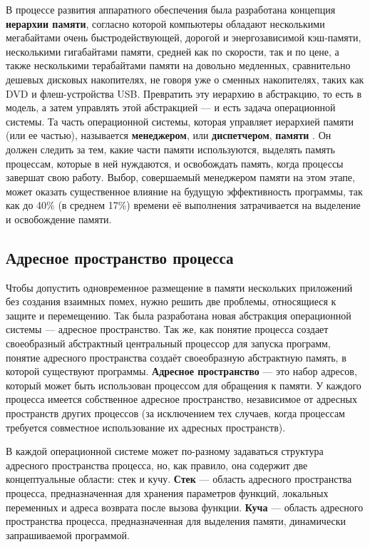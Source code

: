 В процессе развития аппаратного обеспечения была разработана концепция \textbf{иерархии памяти}, согласно которой компьютеры обладают несколькими мегабайтами очень быстродействующей, дорогой и энергозависимой кэш-памяти, несколькими гигабайтами памяти, средней как по скорости, так и по цене, а также несколькими терабайтами памяти на довольно медленных, сравнительно дешевых дисковых накопителях, не говоря уже о сменных накопителях, таких как DVD и флеш-устройства USB. Превратить эту иерархию в абстракцию, то есть в модель, а затем управлять этой абстракцией --- и есть задача операционной системы. Та часть операционной системы, которая управляет иерархией памяти (или ее частью), называется \textbf{менеджером}, или \textbf{диспетчером}, \textbf{памяти} \cite{tannenbaum}. Он должен следить за тем, какие части памяти используются, выделять память процессам, которые в ней нуждаются, и освобождать память, когда процессы завершат свою работу. Выбор, совершаемый менеджером памяти на этом этапе, может оказать существенное влияние на будущую эффективность программы, так как до 40\% (в среднем 17\%) времени её выполнения затрачивается на выделение и освобождение памяти. \cite{cornell}

\clearpage
\subsection{Адресное пространство процесса}

Чтобы допустить одновременное размещение в памяти нескольких приложений без создания взаимных помех, нужно решить две проблемы, относящиеся к защите и перемещению. Так была разработана новая абстракция операционной системы --- адресное пространство. Так же, как понятие процесса создает своеобразный абстрактный центральный процессор для запуска программ, понятие адресного пространства создаёт своеобразную абстрактную память, в которой существуют программы. \textbf{Адресное пространство} \cite{tannenbaum} --- это набор адресов, который может быть использован процессом для обращения к памяти. У каждого процесса имеется собственное адресное пространство, независимое от адресных пространств других процессов (за исключением тех случаев, когда процессам требуется совместное использование их адресных пространств).

В каждой операционной системе может по-разному задаваться структура адресного пространства процесса, но, как правило, она содержит две концептуальные области: стек и кучу. \textbf{Стек} \cite{windows} --- область адресного пространства процесса, предназначенная для хранения параметров функций, локальных переменных и адреса возврата после вызова функции. \textbf{Куча} \cite{linux} --- область адресного пространства процесса, предназначенная для выделения памяти, динамически запрашиваемой программой.

